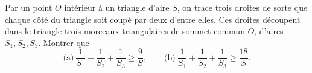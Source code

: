 Par un point $O$ intérieur à un triangle d'aire $S$, on trace trois droites de sorte que chaque côté du triangle soit coupé par deux d'entre elles. Ces droites découpent dans le triangle trois morceaux triangulaires de sommet commun $O$, d'aires $S_1, S_2, S_3$. Montrer que
\[ \text{(a)}\ \frac{1}{S_1} + \frac{1}{S_2} + \frac{1}{S_3} \geq \frac{9}{S},\qquad \text{(b)}\ \frac{1}{S_1} + \frac{1}{S_2} + \frac{1}{S_3} \geq \frac{18}{S}. \]

